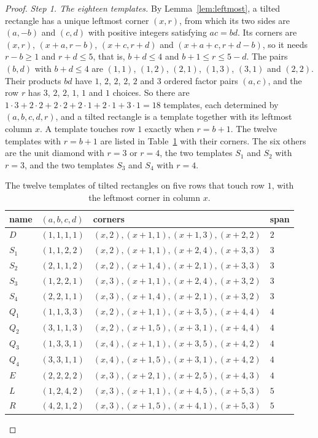 \begin{proof}
\emph{Step 1. The eighteen templates.} By Lemma~\ref{lem:leftmost}, a tilted rectangle has
a unique leftmost corner $(x,r)$, from which its two sides are $(a,-b)$ and $(c,d)$ with
positive integers satisfying $ac=bd$. Its corners are
$(x,r)$, $(x+a,r-b)$, $(x+c,r+d)$ and $(x+a+c,r+d-b)$, so it needs $r-b\ge1$ and $r+d\le5$,
that is, $b+d\le4$ and $b+1\le r\le5-d$. The pairs $(b,d)$ with $b+d\le4$ are $(1,1)$,
$(1,2)$, $(2,1)$, $(1,3)$, $(3,1)$ and $(2,2)$. Their products $bd$ have $1$, $2$, $2$, $2$,
$2$ and $3$ ordered factor pairs $(a,c)$, and the row $r$ has $3$, $2$, $2$, $1$, $1$ and $1$
choices. So there are $1\cdot3+2\cdot2+2\cdot2+2\cdot1+2\cdot1+3\cdot1=18$ templates, each
determined by $(a,b,c,d,r)$, and a tilted rectangle is a template together with its leftmost
column $x$. A template touches row $1$ exactly when $r=b+1$. The twelve templates with $r=b+1$
are listed in Table~\ref{tab:fivetemplates} with their corners. The six others are the unit
diamond with $r=3$ or $r=4$, the two templates $S_1$ and $S_2$ with $r=3$, and the two
templates $S_3$ and $S_4$ with $r=4$.

\begin{table}[t]
\centering\small
\begin{tabular}{@{}llll@{}}
\toprule
name & $(a,b,c,d)$ & corners & span \\
\midrule
$D$ & $(1,1,1,1)$ & $(x,2),(x+1,1),(x+1,3),(x+2,2)$ & $2$ \\
$S_1$ & $(1,1,2,2)$ & $(x,2),(x+1,1),(x+2,4),(x+3,3)$ & $3$ \\
$S_2$ & $(2,1,1,2)$ & $(x,2),(x+1,4),(x+2,1),(x+3,3)$ & $3$ \\
$S_3$ & $(1,2,2,1)$ & $(x,3),(x+1,1),(x+2,4),(x+3,2)$ & $3$ \\
$S_4$ & $(2,2,1,1)$ & $(x,3),(x+1,4),(x+2,1),(x+3,2)$ & $3$ \\
$Q_1$ & $(1,1,3,3)$ & $(x,2),(x+1,1),(x+3,5),(x+4,4)$ & $4$ \\
$Q_2$ & $(3,1,1,3)$ & $(x,2),(x+1,5),(x+3,1),(x+4,4)$ & $4$ \\
$Q_3$ & $(1,3,3,1)$ & $(x,4),(x+1,1),(x+3,5),(x+4,2)$ & $4$ \\
$Q_4$ & $(3,3,1,1)$ & $(x,4),(x+1,5),(x+3,1),(x+4,2)$ & $4$ \\
$E$ & $(2,2,2,2)$ & $(x,3),(x+2,1),(x+2,5),(x+4,3)$ & $4$ \\
$L$ & $(1,2,4,2)$ & $(x,3),(x+1,1),(x+4,5),(x+5,3)$ & $5$ \\
$R$ & $(4,2,1,2)$ & $(x,3),(x+1,5),(x+4,1),(x+5,3)$ & $5$ \\
\bottomrule
\end{tabular}
\caption{The twelve templates of tilted rectangles on five rows that touch row $1$, with the
leftmost corner in column $x$.}
\label{tab:fivetemplates}
\end{table}


\end{proof}
